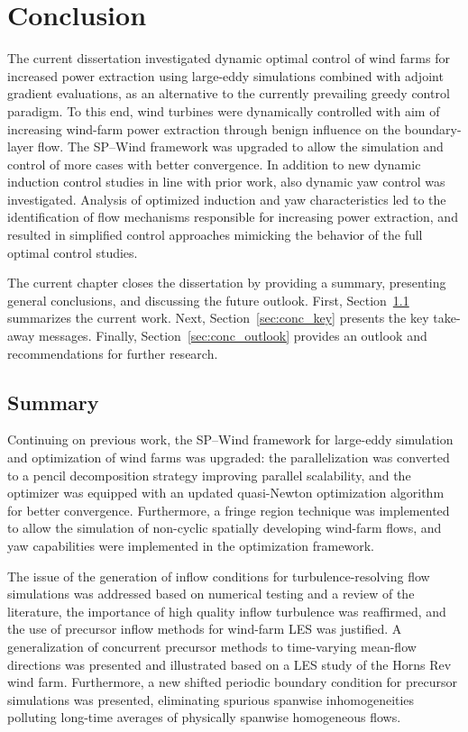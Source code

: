 \chapter{Conclusion}\label{ch:conclusion}

The current dissertation investigated dynamic optimal control of wind farms for increased power extraction using large-eddy simulations combined with adjoint gradient evaluations, as an alternative to the currently prevailing greedy control paradigm. To this end, wind turbines were dynamically controlled with aim of increasing wind-farm power extraction through benign influence on the boundary-layer flow. The SP--Wind framework was upgraded to allow the simulation and control of more cases with better convergence. In addition to new dynamic induction control studies in line with prior work, also dynamic yaw control was investigated. Analysis of optimized induction and yaw characteristics led to the identification of flow mechanisms responsible for increasing power extraction, and resulted in simplified control approaches mimicking the behavior of the full optimal control studies.

The current chapter closes the dissertation by providing a summary, presenting general conclusions, and discussing the future outlook. First, Section~\ref{sec:conc_summ} summarizes the current work. Next, Section~\ref{sec:conc_key} presents the key take-away messages. Finally, Section~\ref{sec:conc_outlook} provides an outlook and recommendations for further research. 

\section{Summary}\label{sec:conc_summ}
Continuing on previous work, the SP--Wind framework for large-eddy simulation and optimization of wind farms was upgraded: the parallelization was converted to a pencil decomposition strategy improving parallel scalability, and the optimizer was equipped with an updated quasi-Newton optimization algorithm for better convergence. Furthermore, a fringe region technique was implemented to allow the simulation of non-cyclic spatially developing wind-farm flows, and yaw capabilities were implemented in the optimization framework.  

The issue of the generation of inflow conditions for turbulence-resolving flow simulations was addressed based on numerical testing and a review of the literature, the importance of high quality inflow turbulence was reaffirmed, and the use of precursor inflow methods for wind-farm LES was justified. A generalization of concurrent precursor methods to time-varying mean-flow directions was presented and illustrated based on a LES study of the Horns Rev wind farm. Furthermore, a new shifted periodic boundary condition for precursor simulations was presented, eliminating spurious spanwise inhomogeneities polluting long-time averages of physically spanwise homogeneous flows. 

